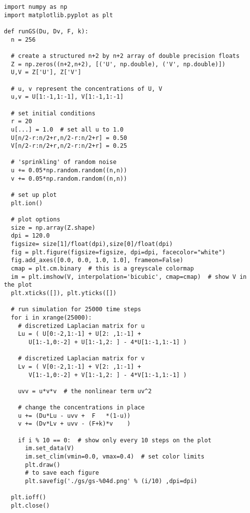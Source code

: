 \begin{Verbatim}[fontsize=\footnotesize,frame=leftline,framesep=5mm]
import numpy as np
import matplotlib.pyplot as plt

def runGS(Du, Dv, F, k):
  n = 256
  
  # create a structured n+2 by n+2 array of double precision floats
  Z = np.zeros((n+2,n+2), [('U', np.double), ('V', np.double)])
  U,V = Z['U'], Z['V']
  
  # u, v represent the concentrations of U, V
  u,v = U[1:-1,1:-1], V[1:-1,1:-1]
  
  # set initial conditions
  r = 20
  u[...] = 1.0  # set all u to 1.0
  U[n/2-r:n/2+r,n/2-r:n/2+r] = 0.50
  V[n/2-r:n/2+r,n/2-r:n/2+r] = 0.25
  
  # 'sprinkling' of random noise
  u += 0.05*np.random.random((n,n))
  v += 0.05*np.random.random((n,n))

  # set up plot
  plt.ion()

  # plot options
  size = np.array(Z.shape)
  dpi = 120.0
  figsize= size[1]/float(dpi),size[0]/float(dpi)
  fig = plt.figure(figsize=figsize, dpi=dpi, facecolor="white")
  fig.add_axes([0.0, 0.0, 1.0, 1.0], frameon=False)
  cmap = plt.cm.binary  # this is a greyscale colormap
  im = plt.imshow(V, interpolation='bicubic', cmap=cmap)  # show V in the plot
  plt.xticks([]), plt.yticks([])	

  # run simulation for 25000 time steps
  for i in xrange(25000):
    # discretized Laplacian matrix for u
    Lu = ( U[0:-2,1:-1] + U[2: ,1:-1] + 
       U[1:-1,0:-2] + U[1:-1,2: ] - 4*U[1:-1,1:-1] )
       
    # discretized Laplacian matrix for v
    Lv = ( V[0:-2,1:-1] + V[2: ,1:-1] + 
       V[1:-1,0:-2] + V[1:-1,2: ] - 4*V[1:-1,1:-1] )

    uvv = u*v*v  # the nonlinear term uv^2
      
    # change the concentrations in place
    u += (Du*Lu - uvv +  F   *(1-u))
    v += (Dv*Lv + uvv - (F+k)*v    )

    if i % 10 == 0:  # show only every 10 steps on the plot
      im.set_data(V)
      im.set_clim(vmin=0.0, vmax=0.4)  # set color limits
      plt.draw()
      # to save each figure
      plt.savefig('./gs/gs-%04d.png' % (i/10) ,dpi=dpi)

  plt.ioff()
  plt.close()
\end{Verbatim}